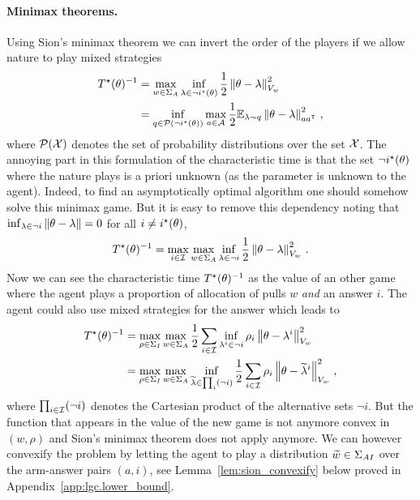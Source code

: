 \paragraph{Minimax theorems.} Using Sion's minimax theorem we can invert the order of the players if we allow nature to play mixed strategies
\begin{align}
T^{\star}(\theta)^{-1} &= \max_{w \in \Sigma_A} \inf_{\lambda\in \neg i^\star(\theta)} \frac{1}{2} \left\lVert\theta - \lambda\right\rVert_{V_w}^2 \label{eq:sion} \\
&= \inf_{q\in \mathcal{P}(\neg i^\star(\theta))} \max_{a\in\mathcal{A}}\frac{1}{2}\mathbb{E}_{\lambda\sim q}\left\lVert\theta - \lambda\right\rVert_{aa^{\mathsf{\scriptscriptstyle T}}}^2\nonumber\,,
\end{align}
where $\mathcal{P}(\mathcal{X})$ denotes the set of probability distributions over the set $\mathcal{X}$. The annoying part in this formulation of the characteristic time is that the set $\neg i^\star(\theta)$ where the nature plays is a priori unknown (as the parameter is unknown to the agent). Indeed, to find an asymptotically optimal algorithm one should somehow solve this minimax game. But it is easy to remove this dependency noting that $\inf_{\lambda\in\neg i}\left\lVert\theta -\lambda\right\rVert=0$ for all $i\neq i^\star(\theta)$,
\[
T^{\star}(\theta)^{-1} = \max_{i\in\mathcal{I}}\max_{w \in \Sigma_A} \inf_{\lambda\in \neg i } \frac{1}{2}\left\lVert\theta - \lambda\right\rVert_{V_w}^2\,.
\]
Now we can see the characteristic time $T^{\star}(\theta)^{-1}$ as the value of an other game where the agent plays a proportion of allocation of pulls $w$ \emph{and} an answer $i$. The agent could also use mixed strategies for the answer which leads to
\begin{align*}
T^{\star}(\theta)^{-1} &= \max_{\rho\in\Sigma_I}\max_{w \in \Sigma_A}  \frac{1}{2}\sum_{i\in \mathcal{I} }\inf_{\lambda^i\in\neg i}\rho_i\left\lVert\theta - \lambda^i\right\rVert_{V_w}^2\\
& =\max_{\rho\in\Sigma_I}\max_{w \in \Sigma_A}\inf_{\widetilde{\lambda}\in\prod_i(\neg i)}  \frac{1}{2}\sum_{i\in \mathcal{I} }\rho_i\left\lVert\theta - \widetilde{\lambda}^i\right\rVert_{V_w}^2\,,
\end{align*}
where $\prod_{i\in\mathcal{I}}(\neg i)$ denotes the Cartesian product of the alternative sets $\neg i$. But the function that appears in the value of the new game is not anymore convex in $(w,\rho)$ and Sion's minimax theorem does not apply anymore. We can however convexify the problem by letting the agent to play a distribution $\widetilde{w}\in\Sigma_{AI}$ over the arm-answer pairs $(a,i)$, see Lemma~\ref{lem:sion_convexify} below proved in Appendix~\ref{app:lgc.lower_bound}.
